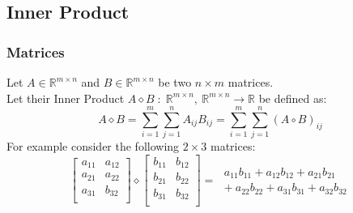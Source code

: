\documentclass[12pt]{article}
\begin{document}
\subsection{Inner Product}
\subsubsection{Matrices}
Let \(A\in \mathbb{R}^{m \times n}\) and \(B\in \mathbb{R}^{m \times n}\) be two \(n \times m\) matrices. \\Let their Inner Product \(A\diamond B\;:\; \mathbb{R}^{m \times n},~\mathbb{R}^{m \times n} \to \mathbb{R}\) be defined as:
\begin{equation} \label{eq:defs:Inner_product}
A \diamond B = \sum_{i=1}^{m}\sum_{j=1}^{n} A_{ij}B_{ij} = \sum_{i=1}^{m}\sum_{j=1}^{n} (A \circ B)_{ij}
\end{equation}
For example consider the following \(2 \times 3\) matrices:
\[
\begin{bmatrix}
a_{11} & a_{12} \\
a_{21} & a_{22} \\
a_{31} & b_{32} \\
\end{bmatrix}
\diamond
\begin{bmatrix}
b_{11} & b_{12} \\
b_{21} & b_{22} \\
b_{31} & b_{32} \\
\end{bmatrix}
= \;
\begin{array}{ll}
     a_{11}b_{11} + a_{12}b_{12} + a_{21}b_{21}\\
+~a_{22}b_{22} + a_{31}b_{31} + a_{32}b_{32} 
\end{array}
\]
\end{document}
